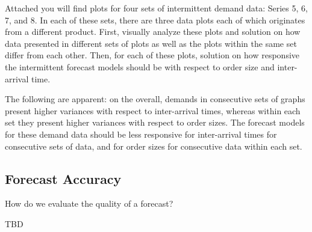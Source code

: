 \begin{question} \label{inter} 
Attached you will find plots for four sets of intermittent demand data: Series 5, 6, 7, and 8. In each of these sets, there are three data plots each of which originates from a different product. First, visually analyze these plots and solution on how data presented in different sets of plots as well as the plots within the same set differ from each other. Then, for each of these plots, solution on how responsive the intermittent forecast models should be with respect to order size and inter-arrival time.
  \begin{solution}
The following are apparent: on the overall, demands in consecutive sets of graphs present higher variances with respect to inter-arrival times, whereas within each set they present higher variances with respect to order sizes. The forecast models for these demand data should be less responsive for inter-arrival times for consecutive sets of data, and for order sizes for consecutive data within each set.
   
  \end{solution}
\end{question}

%
%
%
%
%
%
%
%   


\subsection{Forecast Accuracy}

\begin{question}
How do we evaluate the quality of a forecast?

  \begin{solution}
    TBD
    
%
%

  \end{solution}
\end{question}

